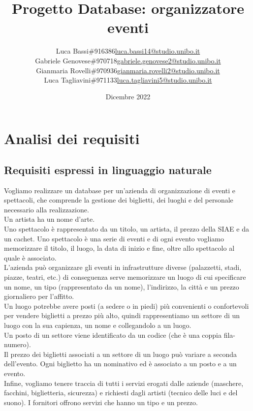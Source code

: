 \documentclass[a4paper,11pt]{article}
\title{\textbf{Progetto Database: organizzatore eventi}}
\author{
  \begin{tabular}{l l l}
    Luca Bassi & \#916386 & \href{mailto:luca.bassi14@studio.unibo.it}{luca.bassi14@studio.unibo.it}\\
    Gabriele Genovese & \#970718 & \href{mailto:gabriele.genovese2@studio.unibo.it}{gabriele.genovese2@studio.unibo.it}\\
    Gianmaria Rovelli & \#970936 & \href{mailto:gianmaria.rovelli2@studio.unibo.it}{gianmaria.rovelli2@studio.unibo.it}\\
    Luca Tagliavini & \#971133 & \href{mailto:luca.tagliavini5@studio.unibo.it}{luca.tagliavini5@studio.unibo.it}
  \end{tabular}
}
\date{Dicembre 2022}
\begin{document}
\maketitle

\tableofcontents

\newpage

\section{Analisi dei requisiti}

\subsection{Requisiti espressi in linguaggio naturale}

Vogliamo realizzare un database per un'azienda di organizzazione di eventi e spettacoli, che comprende la gestione dei biglietti, dei luoghi e del personale necessario alla realizzazione.\\
Un artista ha un nome d'arte.\\
Uno spettacolo è rappresentato da un titolo, un artista, il prezzo della SIAE e da un cachet. Uno spettacolo è una serie di eventi e di ogni evento vogliamo memorizzare il titolo, il luogo, la data di inizio e fine, oltre allo spettacolo al quale è associato.\\
L'azienda può organizzare gli eventi in infrastrutture diverse (palazzetti, stadi, piazze, teatri, etc.) di conseguenza serve memorizzare un luogo di cui specificare un nome, un tipo (rappresentato da un nome), l'indirizzo, la città e un prezzo giornaliero per l'affitto.\\
Un luogo potrebbe avere posti (a sedere o in piedi) più convenienti o confortevoli per vendere biglietti a prezzo più alto, quindi rappresentiamo un settore di un luogo con la sua capienza, un nome e collegandolo a un luogo.\\
Un posto di un settore viene identificato da un codice (che è una coppia fila-numero).\\
Il prezzo dei biglietti associati a un settore di un luogo può variare a seconda dell'evento. Ogni biglietto ha un nominativo ed è associato a un posto e a un evento.\\
Infine, vogliamo tenere traccia di tutti i servizi erogati dalle aziende (maschere, facchini, biglietteria, sicurezza) e richiesti dagli artisti (tecnico delle luci e del suono). I fornitori offrono servizi che hanno un tipo e un prezzo.
\end{document}
